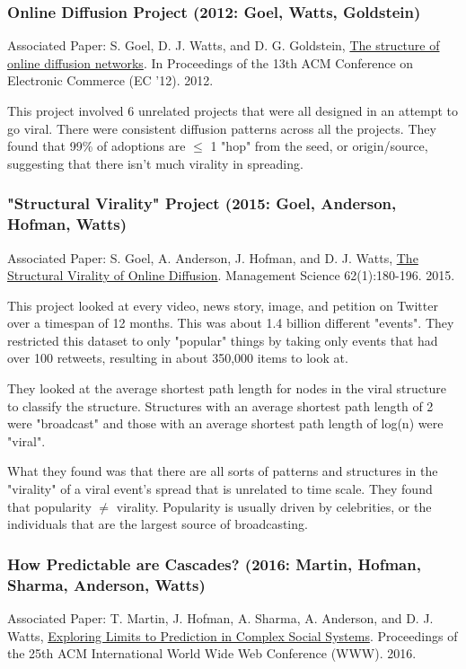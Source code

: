 \subsubsection{Online Diffusion Project (2012: Goel, Watts, Goldstein)}
Associated Paper: S. Goel, D. J. Watts, and D. G. Goldstein, \href{http://dl.acm.org/citation.cfm?id=2229058}{The structure of online diffusion networks}. In Proceedings of the 13th ACM Conference on Electronic Commerce (EC '12). 2012.

\bigskip
This project involved 6 unrelated projects that were all designed in an attempt to go viral. There were consistent diffusion patterns across all the projects. They found that 99\% of adoptions are $\leq$ 1 "hop" from the seed, or origin/source, suggesting that there isn't much virality in spreading.

\subsubsection{"Structural Virality" Project (2015: Goel, Anderson, Hofman, Watts)}
Associated Paper: S. Goel, A. Anderson, J. Hofman, and D. J. Watts,  \href{http://pubsonline.informs.org/doi/pdf/10.1287/mnsc.2015.2158}{The Structural Virality of Online Diffusion}. Management
Science 62(1):180-196. 2015.

\bigskip
This project looked at every video, news story, image, and petition on Twitter over a timespan of 12 months. This was about 1.4 billion different "events". They restricted this dataset to only "popular" things by taking only events that had over 100 retweets, resulting in about 350,000 items to look at.

They looked at the average shortest path length for nodes in the viral structure to classify the structure. Structures with an average shortest path length of 2 were "broadcast" and those with an average shortest path length of log(n) were "viral".

What they found was that there are all sorts of patterns and structures in the "virality" of a viral event's spread that is unrelated to time scale. They found that popularity $\neq$ virality. Popularity is usually driven by celebrities, or the individuals that are the largest source of broadcasting.

\subsubsection{How Predictable are Cascades? (2016: Martin, Hofman, Sharma, Anderson, Watts)}
Associated Paper: T. Martin, J. Hofman, A. Sharma, A. Anderson, and D. J. Watts, \href{http://www2016.net/proceedings/proceedings/p683.pdf}{Exploring Limits to Prediction in Complex Social Systems}.  Proceedings of the 25th ACM International World Wide Web Conference (WWW). 2016.

